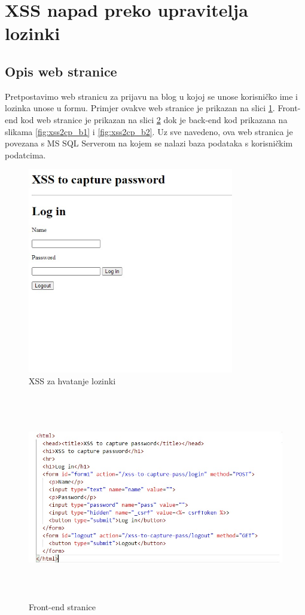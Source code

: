 \documentclass[12pt, oneside, onecolumn]{book}
\begin{document}
{\section{XSS napad preko upravitelja lozinki} \label{xss1}
\subsection{Opis web stranice}
Pretpostavimo web stranicu za prijavu na blog u kojoj se unose korisničko ime i lozinka unose u formu. Primjer ovakve web stranice je prikazan na slici \ref{fig:xss2cp}. Front-end kod web stranice je prikazan na slici \ref{fig:xss2cp_ejs} dok je back-end kod prikazana na slikama \ref{fig:xss2cp_b1} i \ref{fig:xss2cp_b2}. Uz sve navedeno, ova web stranica je povezana s MS SQL Serverom na kojem se nalazi baza podataka s korisničkim podatcima. 

\begin{figure}[H]
	\begin{center}
		\includegraphics[height=9cm]{xss2cp.jpg}
		\caption{XSS za hvatanje lozinki} \label{fig:xss2cp}
	\end{center}
\end{figure}

\begin{figure}[H]
	\begin{center}
		\includegraphics[height=9cm]{xss2cp_ejs.jpg}
		\caption{Front-end stranice} \label{fig:xss2cp_ejs}
	\end{center}
\end{figure}

}
\end{document}
